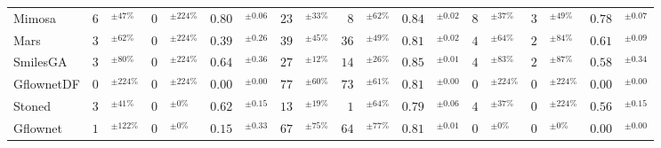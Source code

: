 \begin{tabular}{lr@{}lr@{}lr@{}lr@{}lr@{}lr@{}lr@{}lr@{}lr@{}l}
Mimosa & $6$& $^{\pm47\%}$ & $0$& $^{\pm224\%}$ & $0.80$& $^{\pm0.06}$ & $23$& $^{\pm33\%}$ & $8$& $^{\pm62\%}$ & $0.84$& $^{\pm0.02}$ & $8$& $^{\pm37\%}$ & $3$& $^{\pm49\%}$ & $0.78$& $^{\pm0.07}$ \\
Mars & $3$& $^{\pm62\%}$ & $0$& $^{\pm224\%}$ & $0.39$& $^{\pm0.26}$ & $39$& $^{\pm45\%}$ & $36$& $^{\pm49\%}$ & $0.81$& $^{\pm0.02}$ & $4$& $^{\pm64\%}$ & $2$& $^{\pm84\%}$ & $0.61$& $^{\pm0.09}$ \\
SmilesGA & $3$& $^{\pm80\%}$ & $0$& $^{\pm224\%}$ & $0.64$& $^{\pm0.36}$ & $27$& $^{\pm12\%}$ & $14$& $^{\pm26\%}$ & $0.85$& $^{\pm0.01}$ & $4$& $^{\pm83\%}$ & $2$& $^{\pm87\%}$ & $0.58$& $^{\pm0.34}$ \\
GflownetDF & $0$& $^{\pm224\%}$ & $0$& $^{\pm224\%}$ & $0.00$& $^{\pm0.00}$ & $77$& $^{\pm60\%}$ & $73$& $^{\pm61\%}$ & $0.81$& $^{\pm0.00}$ & $0$& $^{\pm224\%}$ & $0$& $^{\pm224\%}$ & $0.00$& $^{\pm0.00}$ \\
Stoned & $3$& $^{\pm41\%}$ & $0$& $^{\pm0\%}$ & $0.62$& $^{\pm0.15}$ & $13$& $^{\pm19\%}$ & $1$& $^{\pm64\%}$ & $0.79$& $^{\pm0.06}$ & $4$& $^{\pm37\%}$ & $0$& $^{\pm224\%}$ & $0.56$& $^{\pm0.15}$ \\
Gflownet & $1$& $^{\pm122\%}$ & $0$& $^{\pm0\%}$ & $0.15$& $^{\pm0.33}$ & $67$& $^{\pm75\%}$ & $64$& $^{\pm77\%}$ & $0.81$& $^{\pm0.01}$ & $0$& $^{\pm0\%}$ & $0$& $^{\pm0\%}$ & $0.00$& $^{\pm0.00}$ \\
\bottomrule
\end{tabular}